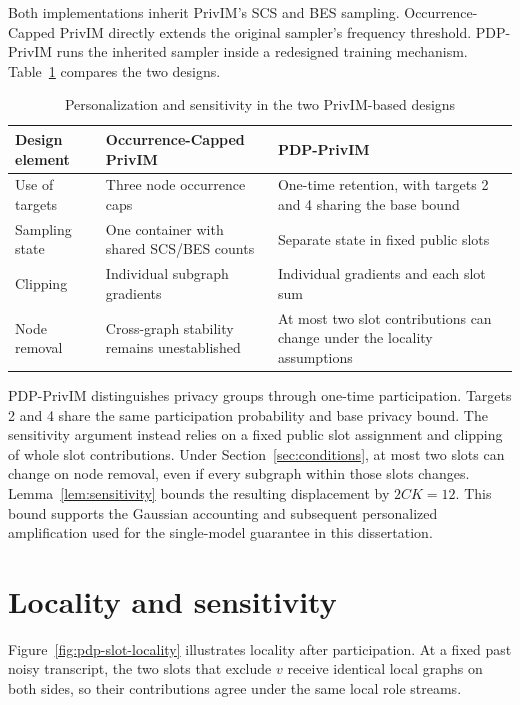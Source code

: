 Both implementations inherit PrivIM's SCS and BES sampling. Occurrence-Capped PrivIM directly extends the original sampler's frequency threshold. PDP-PrivIM runs the inherited sampler inside a redesigned training mechanism. Table~\ref{tab:floor1-comparison} compares the two designs.

\begin{table}[H]
\centering
\caption{Personalization and sensitivity in the two PrivIM-based designs}
\label{tab:floor1-comparison}
\begin{tabularx}{\textwidth}{@{}p{}XX@{}}
\toprule
Design element & Occurrence-Capped PrivIM & PDP-PrivIM \\
\midrule
Use of targets & Three node occurrence caps & One-time retention, with targets 2 and 4 sharing the base bound \\
Sampling state & One container with shared SCS/BES counts & Separate state in fixed public slots \\
Clipping & Individual subgraph gradients & Individual gradients and each slot sum \\
Node removal & Cross-graph stability remains unestablished & At most two slot contributions can change under the locality assumptions \\
\bottomrule
\end{tabularx}
\end{table}

PDP-PrivIM distinguishes privacy groups through one-time participation. Targets 2 and 4 share the same participation probability and base privacy bound. The sensitivity argument instead relies on a fixed public slot assignment and clipping of whole slot contributions. Under Section~\ref{sec:conditions}, at most two slots can change on node removal, even if every subgraph within those slots changes. Lemma~\ref{lem:sensitivity} bounds the resulting displacement by $2CK=12$. This bound supports the Gaussian accounting and subsequent personalized amplification used for the single-model guarantee in this dissertation.

\section{Locality and sensitivity}
Figure~\ref{fig:pdp-slot-locality} illustrates locality after participation. At a fixed past noisy transcript, the two slots that exclude $v$ receive identical local graphs on both sides, so their contributions agree under the same local role streams.

